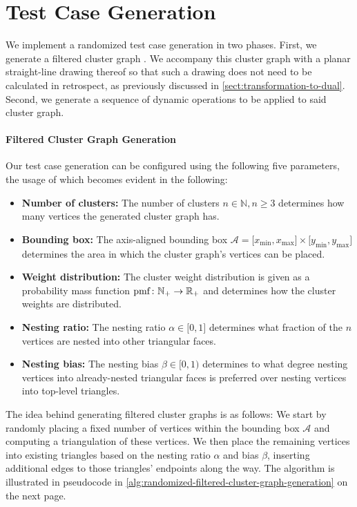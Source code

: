 \section{Test Case Generation}
\label{sect:test-case-generation}

We implement a randomized test case generation in two phases.
First, we generate a filtered cluster graph \clustergraph{}.
We accompany this cluster graph with a planar straight-line drawing \clusterdrawing{} thereof so that such a drawing does not need to be calculated in retrospect, as previously discussed in \cref{sect:transformation-to-dual}.
Second, we generate a sequence of dynamic operations to be applied to said cluster graph.

\paragraph{Filtered Cluster Graph Generation}

Our test case generation can be configured using the following five parameters, the usage of which becomes evident in the following:
%
\begin{itemize}
\item \textbf{Number of clusters:} The number of clusters $n \in \mathbb{N}, n \geq 3$ determines how many vertices the generated cluster graph \clustergraph{} has.
\item \textbf{Bounding box:} The axis-aligned bounding box $\mathcal{A} = \lbrack x_\text{min}, x_\text{max} \rbrack \times \lbrack y_\text{min}, y_\text{max} \rbrack$ determines the area in which the cluster graph's vertices can be placed.
\item \textbf{Weight distribution:} The cluster weight distribution is given as a probability mass function $\operatorname{pmf} \colon \mathbb{N}_+ \to \mathbb{R}_+$ and determines how the cluster weights are distributed.
\item \textbf{Nesting ratio:} The nesting ratio $\alpha \in \lbrack 0, 1 \rbrack$ determines what fraction of the $n$ vertices are nested into other triangular faces.
\item \textbf{Nesting bias:} The nesting bias $\beta \in \lbrack 0, 1 )$ determines to what degree nesting vertices into already-nested triangular faces is preferred over nesting vertices into top-level triangles.
\end{itemize}

The idea behind generating filtered cluster graphs \clustergraph{} is as follows:
We start by randomly placing a fixed number of vertices within the bounding box $\mathcal{A}$ and computing a triangulation of these vertices.
We then place the remaining vertices into existing triangles based on the nesting ratio $\alpha$ and bias $\beta$, inserting additional edges to those triangles' endpoints along the way.
The algorithm is illustrated in pseudocode in \cref{alg:randomized-filtered-cluster-graph-generation} on the next page.

